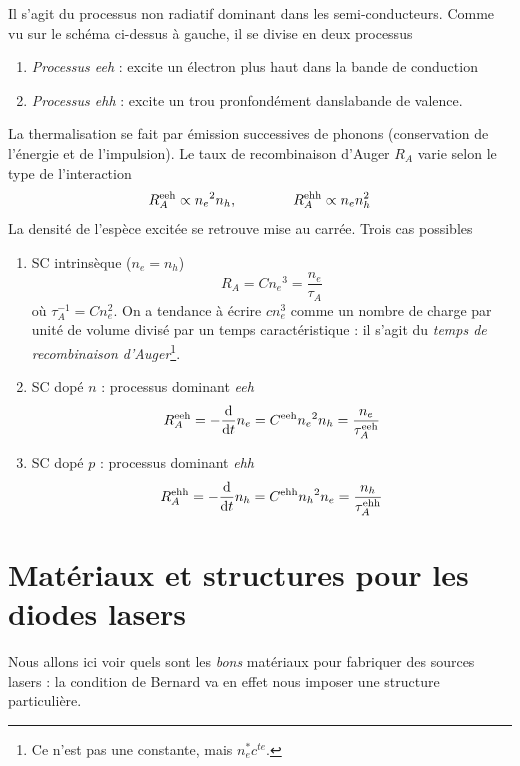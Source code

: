 	Il s'agit du processus non radiatif dominant dans les semi-conducteurs. Comme vu sur le schéma
	ci-dessus à gauche, il se divise en deux processus
	\begin{enumerate}
	\item \textit{Processus eeh} : excite un électron plus haut dans la bande de conduction
	\item \textit{Processus ehh} : excite un trou pronfondément danslabande de valence.
	\end{enumerate}
	La thermalisation se fait par émission successives de phonons (conservation de l'énergie et
	de l'impulsion). Le taux de recombinaison d'Auger $R_A$ varie selon le type de l'interaction
	\begin{equation}
	R_A^{{\rm{eeh}}} \propto {n_e}^2{n_h},\qquad\qquad R_A^{{\rm{ehh}}} \propto {n_e}n_h^2
	\end{equation}
	La densité de l'espèce excitée se retrouve mise au carrée. Trois cas possibles
	\begin{enumerate}
	\item SC intrinsèque ($n_e=n_h$)
	\begin{equation}
	{R_A} = C{n_e}^3 = \frac{{{n_e}}}{{{\tau _A}}}
	\end{equation}
	où $\tau _A^{ - 1} = Cn_e^2$. On a tendance à écrire $cn_e^3$ comme un nombre de charge par 
	unité de volume divisé par un temps caractéristique : il s'agit du \textit{temps de recombinaison
	d'Auger}\footnote{Ce n'est pas une constante, mais $n_e^*c^{te}$.}.
	\item SC dopé $n$ : processus dominant \textit{eeh}
	\begin{equation}
	R_A^{{\rm{eeh}}} =  - \frac{{\rm{d}}}{{{\rm{d}}t}}{n_e} = {C^{{\rm{eeh}}}}{n_e}^2{n_h} = \frac{{{n_e}}}{{\tau _A^{{\rm{eeh}}}}}
	\end{equation}
	\item SC dopé $p$ : processus dominant \textit{ehh}
	\begin{equation}
	R_A^{{\rm{ehh}}} =  - \frac{{\rm{d}}}{{{\rm{d}}t}}{n_h} = {C^{{\rm{ehh}}}}{n_h}^2{n_e} = \frac{{{n_h}}}{{\tau _A^{{\rm{ehh}}}}}
	\end{equation}
	\end{enumerate}
	
	
	
\section{Matériaux et structures pour les diodes lasers}
Nous allons ici voir quels sont les \textit{bons} matériaux pour fabriquer des sources lasers : la 
condition de Bernard va en effet nous imposer une structure particulière.


